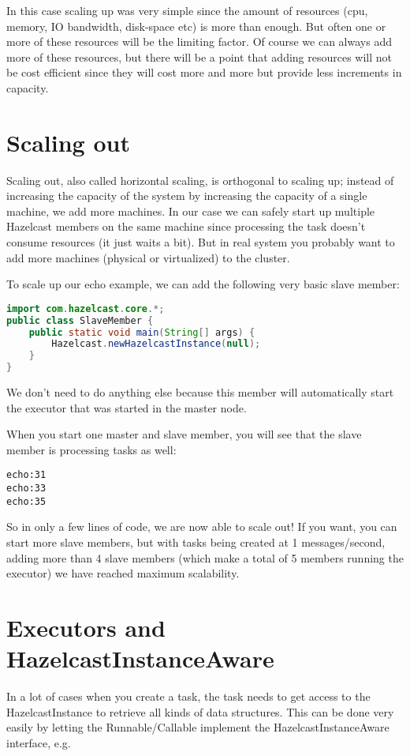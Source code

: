 In this case scaling up was very simple since the amount of resources (cpu, memory, IO bandwidth, disk-space etc) is more than enough. But often one or more of these resources will be the limiting factor. Of course we can always add more of these resources, but there will be a point that adding resources will not be cost efficient since they will cost more and more but provide less increments in capacity.

\section{Scaling out}
Scaling out, also called horizontal scaling, is orthogonal to scaling up; instead of increasing the capacity of the system by increasing the capacity of a single machine, we add more machines. In our case we can safely start up multiple Hazelcast members on the same machine since processing the task doesn't consume resources (it just waits a bit). But in real system you probably want to add more machines (physical or virtualized) to the cluster.

To scale up our echo example, we can add the following very basic slave member:
\begin{lstlisting}[language=java]
import com.hazelcast.core.*;
public class SlaveMember {
    public static void main(String[] args) {
        Hazelcast.newHazelcastInstance(null);
    }
}
\end{lstlisting}
We don't need to do anything else because this member will automatically start the executor that was started in the master node.

When you start one master and slave member, you will see that the slave member is processing tasks as well:
\begin{lstlisting}
echo:31
echo:33
echo:35	
\end{lstlisting}
So in only a few lines of code, we are now able to scale out! If you want, you can start more slave members, but with tasks being created at 1 messages/second, adding more than 4 slave members (which make a total of 5 members running the executor) we have reached maximum scalability. 

\section{Executors and HazelcastInstanceAware}
In a lot of cases when you create a task, the task needs to get access to the HazelcastInstance to retrieve all kinds of data structures. This can be done very easily by letting the Runnable/Callable implement the HazelcastInstanceAware interface, e.g.

